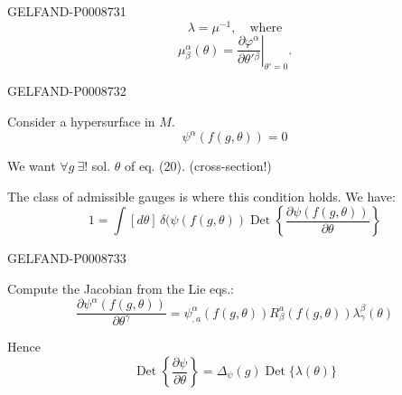 \begin{GelfandAdjacentEvidence}{GELFAND-P000873}{1}
\begin{equation*}
\lambda=\mu^{-1},\quad\text{where}
\tag{19}
\end{equation*}
\begin{equation*}
\mu_\beta^\alpha(\theta)=\left.\frac{\partial\varphi^\alpha}{\partial\theta'{}^\beta}\right|_{\theta'=0}.
\tag*{\((19)'\)}
\end{equation*}
\end{GelfandAdjacentEvidence}
\begin{GelfandAdjacentEvidence}{GELFAND-P000873}{2}


Consider a hypersurface in $M$.
\begin{equation*}
\psi^\alpha(f(g,\theta))=0
\tag{20}
\end{equation*}

We want $\forall g\ \exists!$ sol. $\theta$ of eq. (20). (cross-section!)

The class of admissible gauges is where this condition holds. We have:
\begin{equation*}
1=\int[d\theta]\,\delta(\psi(f(g,\theta))\operatorname{Det}
\left\{\frac{\partial\psi(f(g,\theta))}{\partial\theta}\right\}
\tag{21}
\end{equation*}
\end{GelfandAdjacentEvidence}
\begin{GelfandAdjacentEvidence}{GELFAND-P000873}{3}


Compute the Jacobian from the Lie eqs.:
\begin{equation*}
\frac{\partial\psi^\alpha(f(g,\theta))}{\partial\theta^\gamma}
=\psi^\alpha_{,a}(f(g,\theta))R_\beta^a(f(g,\theta))\lambda_\gamma^\beta(\theta)
\tag{22}
\end{equation*}

Hence
\begin{equation*}
\operatorname{Det}\left\{\frac{\partial\psi}{\partial\theta}\right\}
=\Delta_\psi(g)\operatorname{Det}\{\lambda(\theta)\}
\tag{23}
\end{equation*}
\end{GelfandAdjacentEvidence}
